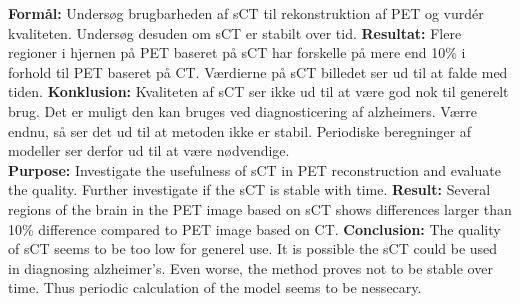 \abstract

\textbf{Formål:} Undersøg brugbarheden af sCT til rekonstruktion af PET og vurdér kvaliteten. Undersøg desuden om sCT er stabilt over tid. \textbf{Resultat:} Flere regioner i hjernen på PET baseret på sCT har forskelle på mere end 10\% i forhold til PET baseret på CT. Værdierne på sCT billedet ser ud til at falde med tiden. \textbf{Konklusion:} Kvaliteten af sCT ser ikke ud til at være god nok til generelt brug. Det er muligt den kan bruges ved diagnosticering af alzheimers. Værre endnu, så ser det ud til at metoden ikke er stabil. Periodiske beregninger af modeller ser derfor ud til at være nødvendige.\\

\textbf{Purpose:} Investigate the usefulness of sCT in PET reconstruction and evaluate the quality. Further investigate if the sCT is stable with time. \textbf{Result:} Several regions of the brain in the PET image based on sCT shows differences larger than 10\% difference compared to PET image based on CT. \textbf{Conclusion:} The quality of sCT seems to be too low for generel use. It is possible the sCT could be used in diagnosing alzheimer's. Even worse, the method proves not to be stable over time. Thus periodic calculation of the model seems to be nessecary.